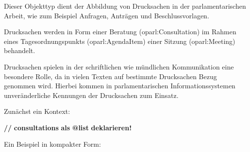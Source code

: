 \documentclass[,a4paper]{article}
\newenvironment{Shaded}{}{}
\newcommand{\ErrorTok}[1]{\textcolor[rgb]{1.00,0.00,0.00}{\textbf{{#1}}}}
\begin{document}

Dieser Objekttyp dient der Abbildung von Drucksachen in der
parlamentarischen Arbeit, wie zum Beispiel Anfragen, Anträgen und
Beschlussvorlagen.

Drucksachen werden in Form einer Beratung (oparl:Consultation) im Rahmen
eines Tagesordnungspunkts (oparl:AgendaItem) einer Sitzung
(oparl:Meeting) behandelt.

Drucksachen spielen in der schriftlichen wie mündlichen Kommunikation
eine besondere Rolle, da in vielen Texten auf bestimmte Drucksachen
Bezug genommen wird. Hierbei kommen in parlamentarischen
Informationssystemen unveränderliche Kennungen der Drucksachen zum
Einsatz.

Zunächst ein Kontext:

\begin{Shaded}
\begin{Highlighting}[]
\ErrorTok{//} \ErrorTok{consultations} \ErrorTok{als} \ErrorTok{@list} \ErrorTok{deklarieren!}
\end{Highlighting}
\end{Shaded}

Ein Beispiel in kompakter Form:
\end{document}
